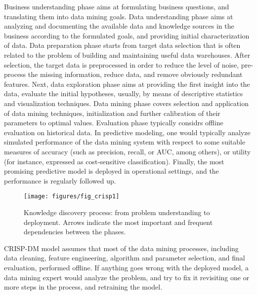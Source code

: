\documentclass{llncs}
\begin{document}
Business understanding phase aims at formulating business questions, and translating them into data mining goals.
Data understanding phase aims at analyzing and documenting the available data and knowledge sources in the business according to the formulated goals, and providing initial characterization of data.
Data preparation phase starts from target data selection that is often related to the problem of building and maintaining useful data warehouses.
After selection, the target data is preprocessed in order to reduce the level of noise, pre-process the missing information, reduce data, and remove obviously redundant features.
Next, data exploration phase aims at providing the first insight into the data, evaluate the initial hypotheses, usually, by means
of descriptive statistics and visualization techniques.
Data mining phase covers selection and application of data mining techniques, initialization and further calibration of their parameters to optimal values.
Evaluation phase typically considrs offline evaluation on historical data.
In predictive modeling, one would typically analyze simulated performance of the data mining system with respect to some suitable measures of accuracy (such as precision, recall, or AUC, among others), or utility (for instance, expressed as cost-sensitive classification).
Finally, the most promising predictive model is deployed in operational settings, and the performance is regularly followed up.
\begin{figure}
\centering
\texttt{[image: figures/fig\_crisp1]}
\caption{Knowledge discovery process: from problem understanding to deployment. Arrows indicate the most important and frequent dependencies between the phases.}
\label{fig:precrisp}
\end{figure}


CRISP-DM model assumes that most of the data mining processes, including data cleaning, feature engineering, algorithm and parameter selection, and final evaluation, performed offline. If anything goes wrong with the deployed model, a data mining expert would analyze the problem, and try to fix it revisiting one or more steps in the process, and retraining the model.
\end{document}
